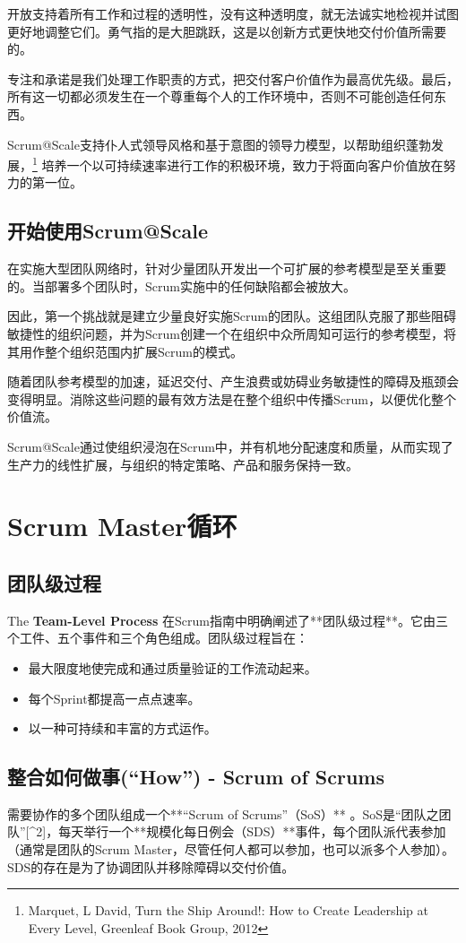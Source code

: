 \documentclass[12pt,a4paper,parskip=full]{scrartcl}
\begin{document}
\begin{CJK*}{UTF8}{gbsn}
开放支持着所有工作和过程的透明性，没有这种透明度，就无法诚实地检视并试图更好地调整它们。勇气指的是大胆跳跃，这是以创新方式更快地交付价值所需要的。

专注和承诺是我们处理工作职责的方式，把交付客户价值作为最高优先级。最后，所有这一切都必须发生在一个尊重每个人的工作环境中，否则不可能创造任何东西。

Scrum@Scale支持仆人式领导风格和基于意图的领导力模型，以帮助组织蓬勃发展，\footnote{Marquet, L
David, Turn the Ship Around!: How to Create Leadership at Every Level,
Greenleaf Book Group, 2012} 培养一个以可持续速率进行工作的积极环境，致力于将面向客户价值放在努力的第一位。

\subsection{开始使用Scrum@Scale}
在实施大型团队网络时，针对少量团队开发出一个可扩展的参考模型是至关重要的。当部署多个团队时，Scrum实施中的任何缺陷都会被放大。

因此，第一个挑战就是建立少量良好实施Scrum的团队。这组团队克服了那些阻碍敏捷性的组织问题，并为Scrum创建一个在组织中众所周知可运行的参考模型，将其用作整个组织范围内扩展Scrum的模式。

随着团队参考模型的加速，延迟交付、产生浪费或妨碍业务敏捷性的障碍及瓶颈会变得明显。消除这些问题的最有效方法是在整个组织中传播Scrum，以便优化整个价值流。

Scrum@Scale通过使组织浸泡在Scrum中，并有机地分配速度和质量，从而实现了生产力的线性扩展，与组织的特定策略、产品和服务保持一致。

\section{Scrum Master循环}
\subsection{团队级过程}
The \textbf{Team-Level Process} 在Scrum指南中明确阐述了**团队级过程**。它由三个工件、五个事件和三个角色组成。团队级过程旨在：
\begin{itemize}
\item 最大限度地使完成和通过质量验证的工作流动起来。
\item 每个Sprint都提高一点点速率。
\item 以一种可持续和丰富的方式运作。
\end{itemize}

\subsection{整合如何做事(“How”) - Scrum of Scrums}
需要协作的多个团队组成一个**“Scrum of Scrums”（SoS）** 。SoS是“团队之团队”[^2]，每天举行一个**规模化每日例会（SDS）**事件，每个团队派代表参加（通常是团队的Scrum Master，尽管任何人都可以参加，也可以派多个人参加）。SDS的存在是为了协调团队并移除障碍以交付价值。


\end{CJK*}
\end{document}
